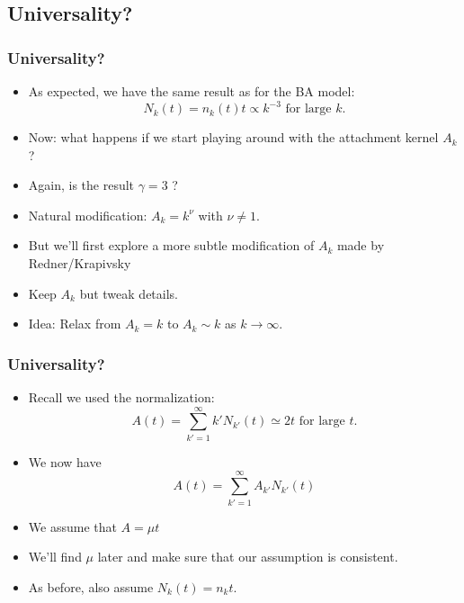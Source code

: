 \subsection{Universality?}

\begin{frame}
  \frametitle{Universality?}

  \begin{itemize}
  \item<1->
    As expected, we have the same result as for the BA model:
    $$
    N_k(t) = n_k(t) t \propto k^{-3} \mbox{\ for large $k$}.
    $$
  \item<2->
    Now: what happens if we start playing around with 
    the attachment kernel $A_k$?
  \item<3->
    Again, is the result $\gamma=3$
    ?
  \item<4->
    Natural modification: $A_k = k^\nu$ with $\nu \ne 1$.
  \item<5->
    But we'll first explore a more subtle modification of $A_k$ made by Redner/Krapivsky\cite{krapivsky2001a}
  \item<6->
    Keep $A_k$  but tweak details.
  \item<7->
    \alert{Idea:} Relax from $A_k = k$ to $A_k \sim k$ as $k \rightarrow \infty$.
  \end{itemize}

\end{frame}

\begin{frame}
  \frametitle{Universality?}
  
  \begin{itemize}
  \item<1->
    Recall we used the normalization:
    $$
    A(t) 
    = 
    \sum_{k'=1}^{\infty}
    k' N_{k'}(t)
    \simeq 2t
    \mbox{\ for large $t$.}
    $$
  \item<2->
    We now have 
    $$
    A(t) 
    = 
    \sum_{k'=1}^{\infty}
    A_{k'} N_{k'}(t)
    $$
  \item<4->
    We assume that \alert{$A = \mu t$}
  \item<5->
    We'll find $\mu$ later and make sure that our
    assumption is consistent.
  \item<6->
    As before, also assume $N_k(t) = n_k t$.
  \end{itemize}

\end{frame}

